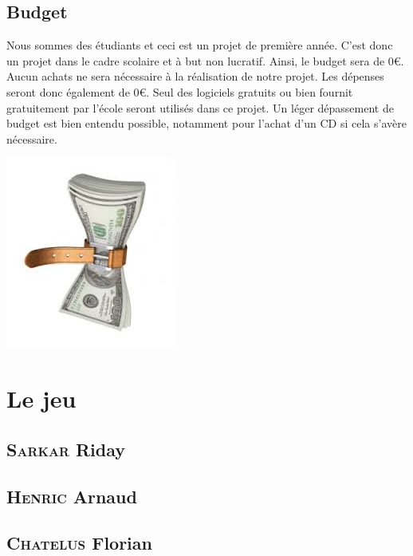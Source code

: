 \documentclass[a4paper, 12pt]{article}
\begin{document}
\subsection{Budget}

Nous sommes des étudiants et ceci est un projet de première année. C'est donc un projet dans le cadre scolaire et à but non lucratif. Ainsi, le budget sera de 0\euro{}. Aucun achats ne sera nécessaire à la réalisation de notre projet. Les dépenses seront donc également de 0\euro{}. Seul des logiciels gratuits ou bien fournit gratuitement par l'école seront utilisés dans ce projet. Un léger dépassement de budget est bien entendu possible, notamment pour l'achat d'un CD si cela s'avère nécessaire.\\
\centerline{\includegraphics[scale=0.7]{images.jpg}}
\section{Le jeu}
	\subsection{\textsc{Sarkar} Riday}
	\subsection{\textsc{Henric} Arnaud}
	\subsection{\textsc{Chatelus} Florian}
\end{document}
